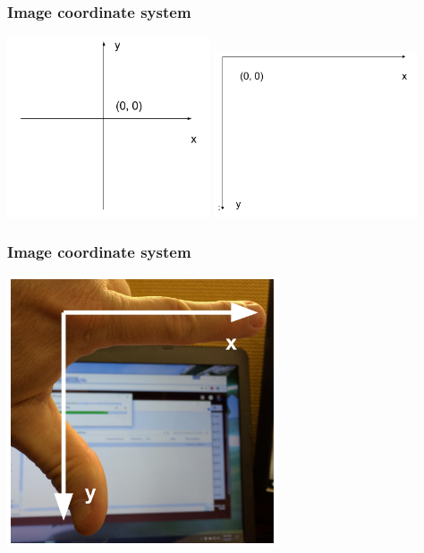 \documentclass{beamer}
\begin{document}
\begin{frame}
	\frametitle{Image coordinate system}

	{
	\centering
	\includegraphics[width=0.45\textwidth]{../../fig/01-cartesian.png}%
	\includegraphics[width=0.45\textwidth]{../../fig/01-image-coordinates.png}
	}

\end{frame}

\begin{frame}
	\frametitle{Image coordinate system}

	\begin{center}
	\includegraphics[width=0.6\textwidth]{../../fig/01-left-hand-coordinates.png}
	\end{center}

\end{frame}
\end{document}
